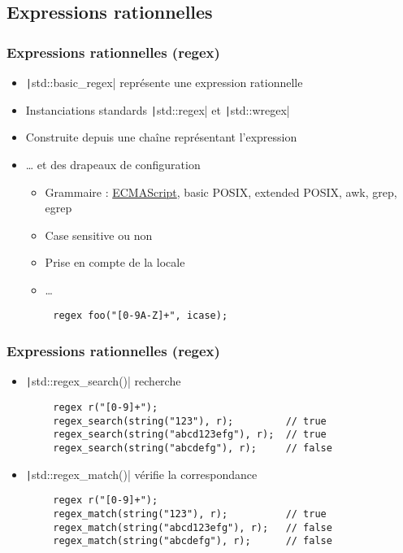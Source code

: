 \documentclass[C++.tex]{subfiles}
\begin{document}
\subsection*{Expressions rationnelles}
\begin{frame}[fragile]
	\frametitle{Expressions rationnelles (regex)}
	\begin{itemize}
		\item \texttt|std::basic_regex| représente une expression rationnelle
		\item Instanciations standards \texttt|std::regex| et \texttt|std::wregex|
		\item Construite depuis une chaîne représentant l'expression
		\item \ldots{} et des drapeaux de configuration
		\begin{itemize}
			\item Grammaire : \underline{ECMAScript}, basic POSIX, extended POSIX, awk, grep, egrep
			\item Case sensitive ou non
			\item Prise en compte de la locale
			\item \ldots{}
		\end{itemize}
	\end{itemize}

	\begin{verbatim}
		regex foo("[0-9A-Z]+", icase);
	\end{verbatim}

\end{frame}

\begin{frame}[fragile]
	\frametitle{Expressions rationnelles (regex)}
	\begin{itemize}
		\item\texttt|std::regex_search()| recherche
	\end{itemize}

	\begin{verbatim}
		regex r("[0-9]+");
		regex_search(string("123"), r);         // true
		regex_search(string("abcd123efg"), r);  // true
		regex_search(string("abcdefg"), r);     // false
	\end{verbatim}

	\begin{itemize}
		\item \texttt|std::regex_match()| vérifie la correspondance
	\end{itemize}

	\begin{verbatim}
		regex r("[0-9]+");
		regex_match(string("123"), r);          // true
		regex_match(string("abcd123efg"), r);   // false
		regex_match(string("abcdefg"), r);      // false
	\end{verbatim}
\end{frame}
\end{document}
